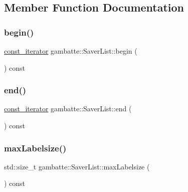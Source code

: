 \subsection{Member Function Documentation}
\mbox{\label{classgambatte_1_1SaverList_a42e8fc9e06ed110c54876038b9af8a1b}} 
\subsubsection{\texorpdfstring{begin()}{begin()}}
{\footnotesize\ttfamily \hyperlink{classgambatte_1_1SaverList_a6c4bcf85cbbff11fb4a7e01f64c55631}{const\+\_\+iterator} gambatte\+::\+Saver\+List\+::begin (\begin{DoxyParamCaption}{ }\end{DoxyParamCaption}) const\hspace{0.3cm}{\ttfamily [inline]}}

\mbox{\label{classgambatte_1_1SaverList_ab7c2912d5252aab65666cef9290e6b84}} 
\subsubsection{\texorpdfstring{end()}{end()}}
{\footnotesize\ttfamily \hyperlink{classgambatte_1_1SaverList_a6c4bcf85cbbff11fb4a7e01f64c55631}{const\+\_\+iterator} gambatte\+::\+Saver\+List\+::end (\begin{DoxyParamCaption}{ }\end{DoxyParamCaption}) const\hspace{0.3cm}{\ttfamily [inline]}}

\mbox{\label{classgambatte_1_1SaverList_a3016ee3e53b04df7949e7696dba399eb}} 
\subsubsection{\texorpdfstring{max\+Labelsize()}{maxLabelsize()}}
{\footnotesize\ttfamily std\+::size\+\_\+t gambatte\+::\+Saver\+List\+::max\+Labelsize (\begin{DoxyParamCaption}{ }\end{DoxyParamCaption}) const\hspace{0.3cm}{\ttfamily [inline]}}



